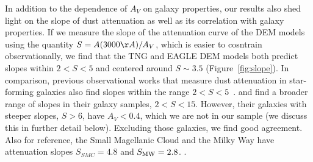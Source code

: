 
In addition to the dependence of $A_V$ on galaxy properties, our results also
shed light on the slope of dust attenuation as well as its correlation with 
galaxy properties. If we measure the slope of the attenuation curve of the DEM
models using the quantity $S = A(3000\AA)/A_V$, which is easier to cosntrain 
observationally, we find that the TNG and EAGLE DEM models both predict
slopes within $2 < S < 5$ and centered around $S\sim 3.5$ (Figure~\ref{fig:slope}).
In comparison, previous observational works that measure dust attenuation in
star-forming galaxies also find slopes within the range $2 < S <
5$~\citep{calzetti2000, burgarella2005, johnson2007, conroy2010, wild2011,
battisti2016, battisti2017}. \cite{leja2017} and \cite{salim2018} find a
broader range of slopes in their galaxy samples, $2 < S < 15$. However,
their galaxies with steeper slopes, $S > 6$, have $A_V < 0.4$, which we are not
in our sample (we discuss this in further detail below). Excluding those
galaxies, we find good agreement. Also for reference, the Small Magellanic Cloud 
and the Milky Way have attenuation slopes $S_{SMC} = 4.8$ and $S_{\rm MW} = 2.8$. 
. 


